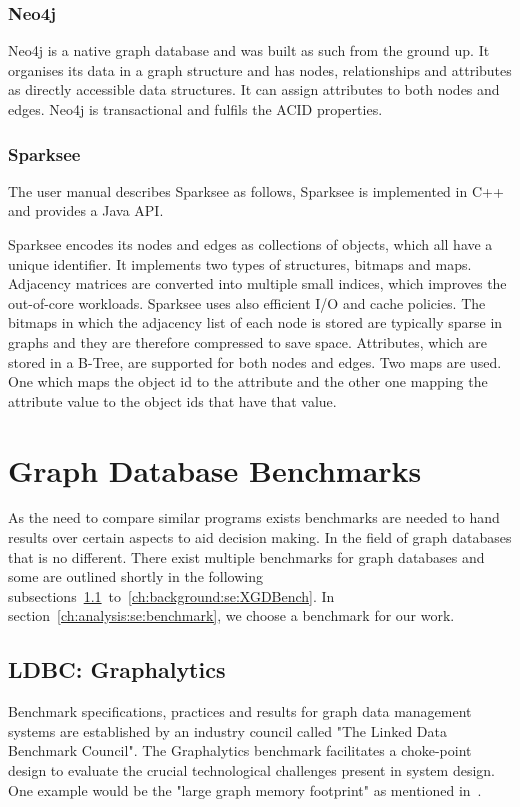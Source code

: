 \subsubsection{Neo4j}
Neo4j is a native graph database and was built as such from the ground up.
It organises its data in a graph structure and has nodes, relationships and attributes as directly accessible data structures.
It can assign attributes to both nodes and edges.
Neo4j is transactional and fulfils the ACID properties.~\cite{Neo4jInc.2006}

\subsubsection{Sparksee}
The user manual describes Sparksee as follows, 
Sparksee is implemented in C++ and provides a Java API.

Sparksee encodes its nodes and edges as collections of objects, which all have a unique identifier.
It implements two types of structures, bitmaps and maps.
Adjacency matrices are converted into multiple small indices,
which improves the out-of-core workloads.
Sparksee uses also efficient I/O and cache policies.
The bitmaps in which the adjacency list of each node is stored are typically sparse in graphs and they are therefore compressed to save space.
Attributes,
which are stored in a B-Tree,
are supported for both nodes and edges.
Two maps are used.
One which maps the object id to the attribute and the other one mapping the attribute value to the object ids that have that value.~\cite{TaoShen}

\section{Graph Database Benchmarks}
\label{ch:background:se:graphDatabaseBenchmarks}
As the need to compare similar programs exists benchmarks are needed to hand results over certain aspects to aid decision making.
In the field of graph databases that is no different.
There exist multiple benchmarks for graph databases and some are outlined shortly in the following subsections~\ref{ch:background:se:ldbcGraphalytics}~to~\ref{ch:background:se:XGDBench}.
In section~\ref{ch:analysis:se:benchmark},
we choose a benchmark for our work.

\subsection{LDBC: Graphalytics}
\label{ch:background:se:ldbcGraphalytics}
Benchmark specifications, practices and results for graph data management systems are established by an industry council called "The Linked Data Benchmark Council".
The Graphalytics benchmark facilitates a choke-point design to evaluate the crucial technological challenges present in system design.
One example would be the "large graph memory footprint" as mentioned in~\cite[2]{Capota2015}.

